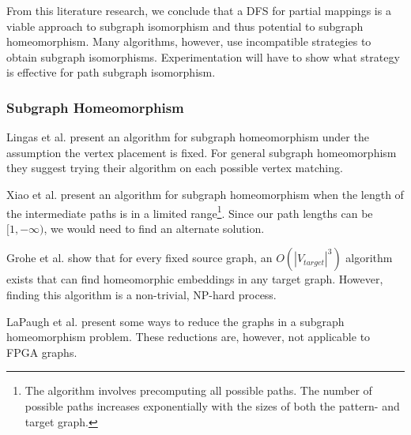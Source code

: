 From this literature research, we conclude that a DFS for partial mappings is a viable approach to subgraph isomorphism and thus potential to subgraph homeomorphism. Many algorithms, however, use incompatible strategies to obtain subgraph isomorphisms. Experimentation will have to show what strategy is effective for path subgraph isomorphism.


\subsubsection{Subgraph Homeomorphism}
Lingas et al.\cite{LINGAS2009464} present an algorithm for subgraph homeomorphism under the assumption the vertex placement is fixed. For general subgraph homeomorphism they suggest trying their algorithm on each possible vertex matching.

Xiao et al.\cite{XIAONODEDISJOINT} present an algorithm for subgraph homeomorphism when the length of the intermediate paths is in a limited range\footnote{The algorithm involves precomputing all possible paths. The number of possible paths increases exponentially with the sizes of both the pattern- and target graph.}. Since our path lengths can be $[1, -\infty)$, we would need to find an alternate solution.

Grohe et al.\cite{Grohe2011479} show that for every fixed source graph, an $O(|V_{target}|^3)$ algorithm exists that can find homeomorphic embeddings in any target graph. However, finding this algorithm is a non-trivial, NP-hard process.

LaPaugh et al.\cite{LaPaughOptim} present some ways to reduce the graphs in a subgraph homeomorphism problem. These reductions are, however, not applicable to FPGA graphs.


